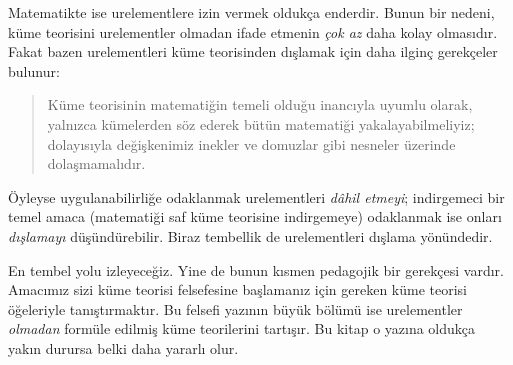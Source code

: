Matematikte ise urelementlere izin vermek oldukça enderdir. Bunun bir nedeni,
küme teorisini urelementler olmadan ifade etmenin \emph{çok az} daha kolay
olmasıdır. Fakat bazen urelementleri küme teorisinden dışlamak için daha ilginç
gerekçeler bulunur:
\begin{quote}
  Küme teorisinin matematiğin temeli olduğu inancıyla uyumlu olarak, yalnızca
  kümelerden söz ederek bütün matematiği yakalayabilmeliyiz; dolayısıyla
  değişkenimiz inekler ve domuzlar gibi nesneler üzerinde dolaşmamalıdır.
  \citep[p.~8]{Kunen1980}
\end{quote}
Öyleyse uygulanabilirliğe odaklanmak urelementleri \emph{dâhil etmeyi};
indirgemeci bir temel amaca (matematiği saf küme teorisine indirgemeye)
odaklanmak ise onları \emph{dışlamayı} düşündürebilir. Biraz tembellik de
urelementleri dışlama yönündedir.

En tembel yolu izleyeceğiz. Yine de bunun kısmen pedagojik bir gerekçesi
vardır. Amacımız sizi küme teorisi felsefesine başlamanız için gereken küme
teorisi öğeleriyle tanıştırmaktır. Bu felsefi yazının büyük bölümü ise
urelementler \emph{olmadan} formüle edilmiş küme teorilerini tartışır. Bu
kitap o yazına oldukça yakın durursa belki daha yararlı olur.

